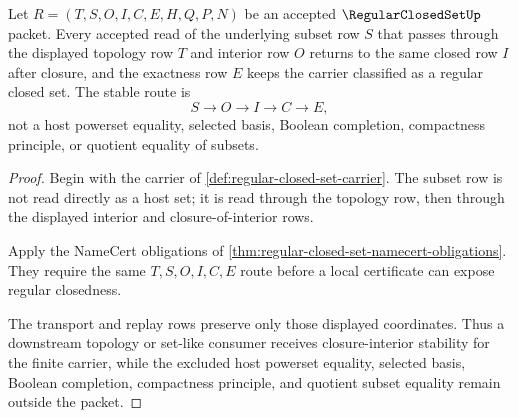 \begin{theorem}
\label{thm:regular-closed-set-closure-interior-stability}
Let $R=(T,S,O,I,C,E,H,Q,P,N)$ be an accepted $\RegularClosedSetUp$ packet. Every accepted read of the underlying subset row $S$ that passes through the displayed topology row $T$ and interior row $O$ returns to the same closed row $I$ after closure, and the exactness row $E$ keeps the carrier classified as a regular closed set. The stable route is
$$
S \to O \to I \to C \to E,
$$
not a host powerset equality, selected basis, Boolean completion, compactness principle, or quotient equality of subsets.
\end{theorem}
\begin{proof}
Begin with the carrier of \autoref{def:regular-closed-set-carrier}. The subset row is not read directly as a host set; it is read through the topology row, then through the displayed interior and closure-of-interior rows.

Apply the NameCert obligations of \autoref{thm:regular-closed-set-namecert-obligations}. They require the same $T,S,O,I,C,E$ route before a local certificate can expose regular closedness.

The transport and replay rows preserve only those displayed coordinates. Thus a downstream topology or set-like consumer receives closure-interior stability for the finite carrier, while the excluded host powerset equality, selected basis, Boolean completion, compactness principle, and quotient subset equality remain outside the packet.
\end{proof}




